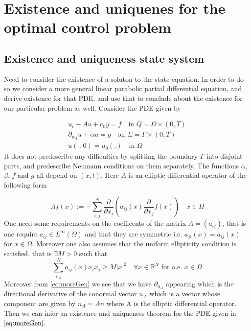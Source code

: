 \section{Existence and uniquenes for the optimal control problem}

\subsection{Existence and uniqueness state system}
Need to consider the existence of a soluton to the state equation. In order to do so we consider a more general linear parabolic partial differential equation, and derive existence for that PDE, and use that to conclude about the existence for our particular problem as well. Consider the PDE given by

\begin{align}
    \label{eq:moreGen}
    u_t - Au + c_0 y = f \quad \text{in } Q = \Omega \times (0,T) \\
    \partial_{n_A} u + \alpha u = g \quad \text{on } \Sigma = \Gamma \times (0,T) \\
    u(.,0) = u_0(.) \quad \text{in } \Omega
\end{align}
It does not predescribe any difficulties by splitting the boundary $\Gamma$ into disjoint parts, and predescribe Neumann conditions on them separately. The functions $\alpha$, $\beta$, $f$ and $g$ all depend on $(x,t)$. Here $A$ is an elliptic differential operator of the following form

\begin{equation*}
    Af(x) := -\sum_{i,j}^N\frac{\partial}{\partial x_i}(a_{ij}(x)\frac{\partial}{\partial x_j}f(x)) \quad x\in \Omega
\end{equation*}
One need some requirements on the coefficents of the matrix $A=(a_{ij})$, that is one require $a_{ij} \in L^{\infty}(\Omega)$ and that they are symmetric i.e. $a_{ji}(x) = a_{ij}(x)$ for $x\in \Omega$. Moreover one also assumes that the uniform ellipticity condition is satisfied, that is $\exists M>0$ such that 
\begin{equation*}
    \label{eq:uniformEl}
    \sum_{i,j}^N a_{ij}(x)x_i x_j \geq M|x|^2 \quad \forall x \in \mathbb{R}^N \text{ for a.e. $x\in \Omega$}
\end{equation*}
Moreover from \eqref{eq:moreGen} we see that we have $\partial_{n_A}$ appearing which is the directional derivative of the conormal vector $n_{A}$ which is a vector whose component are given by $n_{A} = An$ where A is the elliptic differential operator. Then we can infer an existence and uniqueness theorem for the PDE given in \eqref{eq:moreGen}. 


